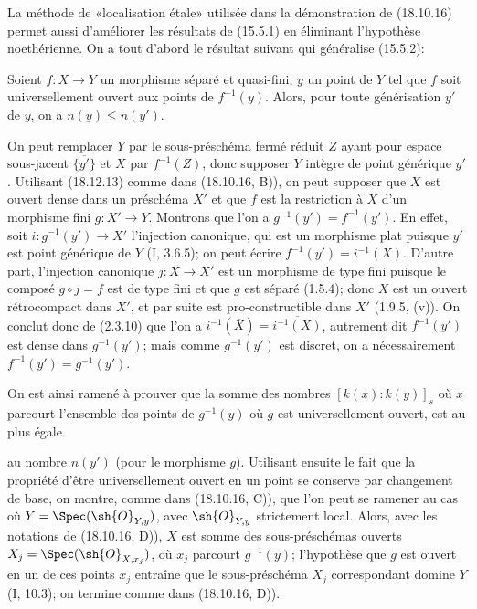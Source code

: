 \begin{remark}[18.10.17]
\label{IV.18.10.17}
La méthode de «localisation étale» utilisée dans la démonstration de (18.10.16) permet aussi d'améliorer les résultats de (15.5.1) en éliminant l'hypothèse noethérienne. On a tout d'abord le résultat suivant qui généralise (15.5.2):
\end{remark}

\begin{env}[18.10.17.1]
\label{IV.18.10.17.1}
Soient $f:X\to Y$ un morphisme séparé et quasi-fini, $y$ un point de $Y$ tel que $f$ soit universellement ouvert aux points de $f^{-1}(y)$. Alors, pour toute générisation $y'$ de $y$, on a $n(y)\leq n(y')$.
\end{env}

On peut remplacer $Y$ par le sous-préschéma fermé réduit $Z$ ayant pour espace sous-jacent $\overline{\{y'\}}$ et $X$ par $f^{-1}(Z)$, donc supposer $Y$ intègre de point générique $y'$. Utilisant (18.12.13) comme dans (18.10.16, B)), on peut supposer que $X$ est ouvert dense dans un préschéma $X'$ et que $f$ est la restriction à $X$ d'un morphisme fini $g:X'\to Y$. Montrons que l'on a $g^{-1}(y')=f^{-1}(y')$. En effet, soit $i:g^{-1}(y')\to X'$ l'injection canonique, qui est un morphisme plat puisque $y'$ est point générique de $Y$ (I, 3.6.5); on peut écrire $f^{-1}(y')=i^{-1}(X)$. D'autre part, l'injection canonique $j:X\to X'$ est un morphisme de type fini puisque le composé $g\circ j=f$ est de type fini et que $g$ est séparé (1.5.4); donc $X$ est un ouvert rétrocompact dans $X'$, et par suite est pro-constructible dans $X'$ (1.9.5, (v)). On conclut donc de (2.3.10) que l'on a $i^{-1}(\overline{X})=\overline{i^{-1}(X)}$, autrement dit $f^{-1}(y')$ est dense dans $g^{-1}(y')$; mais comme $g^{-1}(y')$ est discret, on a nécessairement $f^{-1}(y')=g^{-1}(y')$.

On est ainsi ramené à prouver que la somme des nombres $[k(x):k(y)]_s$ où $x$ parcourt l'ensemble des points de $g^{-1}(y)$ où $g$ est universellement ouvert, est au plus égale


au nombre $n(y')$ (pour le morphisme $g$). Utilisant ensuite le fait que la propriété d'être universellement ouvert en un point se conserve par changement de base, on montre, comme dans (18.10.16, C)), que l'on peut se ramener au cas où $Y=\Spec(\sh{O}_{Y,y})$, avec $\sh{O}_{Y,y}$ strictement local. Alors, avec les notations de (18.10.16, D)), $X$ est somme des sous-préschémas ouverts $X_j=\Spec(\sh{O}_{X,x_j})$, où $x_j$ parcourt $g^{-1}(y)$; l'hypothèse que $g$ est ouvert en un de ces points $x_j$ entraîne que le sous-préschéma $X_j$ correspondant domine $Y$ (I, 10.3); on termine comme dans (18.10.16, D)).

